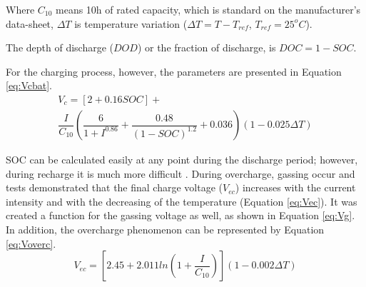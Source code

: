 \documentclass[journal]{IEEEtran}
\begin{document}
Where $ C_{10} $ means 10h of rated capacity, which is standard on the manufacturer's data-sheet, $ \Delta T $ is temperature variation ($ \Delta T=T-T_{ref} $, $ T_{ref}=25^{o}C $). %
%
%

The depth of discharge ($ DOD $) or the fraction of discharge, is $ DOC=1-SOC $.

%
%

For the charging process, however, the parameters are presented in Equation \ref{eq:Vcbat}.
%
\begin{multline}
\label{eq:Vcbat}
V_{c} = [2+0.16SOC]+ \\ \dfrac{I}{C_{10}} \left( \dfrac{6}{1+I^{0.86}} + \dfrac{0.48}{(1-SOC)^{1.2}} + 0.036  \right) (1-0.025 \Delta T)
\end{multline}

SOC can be calculated easily at any point during the discharge period; however, during recharge it is much more difficult \cite{Copetti}.
%
During overcharge, gassing occur and tests demonstrated that the final charge voltage ($ V_{ec} $) increases with the current intensity and with the decreasing of the temperature (Equation \ref{eq:Vec}). It was created a function for the gassing voltage as well, as shown in Equation \ref{eq:Vg}. In addition, the overcharge phenomenon can be represented by Equation \ref{eq:Voverc}.
\begin{equation}
\label{eq:Vec}
V_{ec} = \left[ 2.45 + 2.011 ln \left( 1+\dfrac{I}{C_{10}} \right)  \right] (1-0.002 \Delta T)
\end{equation}
\end{document}
